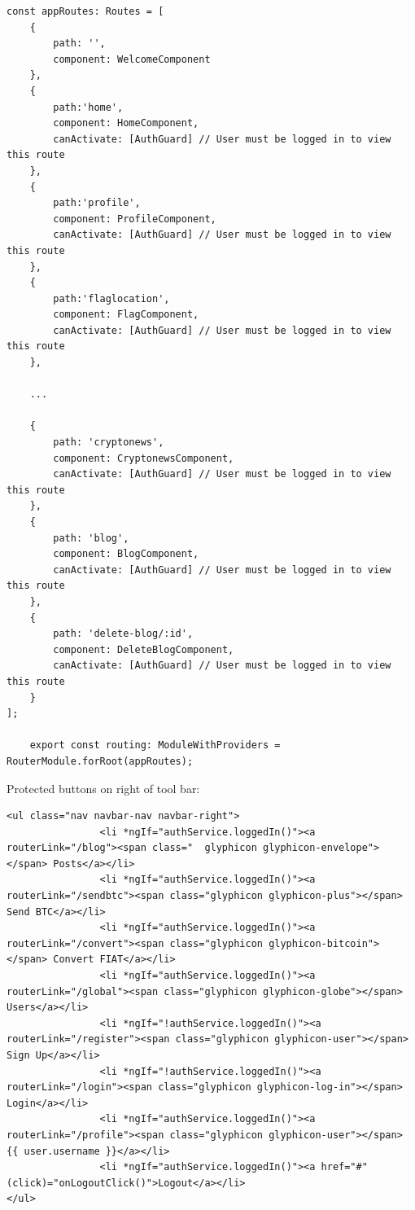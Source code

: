 \begin{lstlisting}
const appRoutes: Routes = [
    {
        path: '',
        component: WelcomeComponent
    },
    {
        path:'home',
        component: HomeComponent,
        canActivate: [AuthGuard] // User must be logged in to view this route
    },
    {
        path:'profile',
        component: ProfileComponent,
        canActivate: [AuthGuard] // User must be logged in to view this route
    },
    {
        path:'flaglocation',
        component: FlagComponent,
        canActivate: [AuthGuard] // User must be logged in to view this route
    },
    
    ...
    
    {
        path: 'cryptonews',
        component: CryptonewsComponent,
        canActivate: [AuthGuard] // User must be logged in to view this route
    },
    {
        path: 'blog',
        component: BlogComponent,
        canActivate: [AuthGuard] // User must be logged in to view this route
    },
    {
        path: 'delete-blog/:id',
        component: DeleteBlogComponent,
        canActivate: [AuthGuard] // User must be logged in to view this route
    }
];
    
    export const routing: ModuleWithProviders = RouterModule.forRoot(appRoutes);
\end{lstlisting}

Protected buttons on right of tool bar:
\begin{lstlisting}
<ul class="nav navbar-nav navbar-right">
                <li *ngIf="authService.loggedIn()"><a routerLink="/blog"><span class="	glyphicon glyphicon-envelope"></span> Posts</a></li>
                <li *ngIf="authService.loggedIn()"><a routerLink="/sendbtc"><span class="glyphicon glyphicon-plus"></span> Send BTC</a></li>
                <li *ngIf="authService.loggedIn()"><a routerLink="/convert"><span class="glyphicon glyphicon-bitcoin"></span> Convert FIAT</a></li>
                <li *ngIf="authService.loggedIn()"><a routerLink="/global"><span class="glyphicon glyphicon-globe"></span> Users</a></li>
                <li *ngIf="!authService.loggedIn()"><a routerLink="/register"><span class="glyphicon glyphicon-user"></span> Sign Up</a></li>
                <li *ngIf="!authService.loggedIn()"><a routerLink="/login"><span class="glyphicon glyphicon-log-in"></span> Login</a></li>
                <li *ngIf="authService.loggedIn()"><a routerLink="/profile"><span class="glyphicon glyphicon-user"></span> {{ user.username }}</a></li>
                <li *ngIf="authService.loggedIn()"><a href="#" (click)="onLogoutClick()">Logout</a></li>
</ul>
\end{lstlisting}

